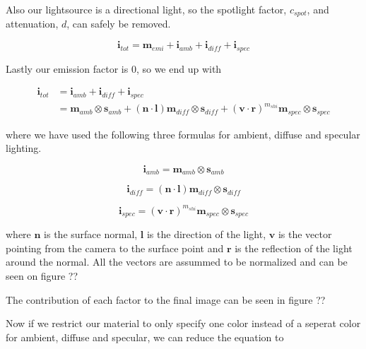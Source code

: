 Also our lightsource is a directional light, so the spotlight factor,
$c_{spot}$, and attenuation, $d$, can safely be removed.

\begin{displaymath}
  \mathbf{i}_{tot} = \mathbf{m}_{emi} + \mathbf{i}_{amb} + \mathbf{i}_{diff} + \mathbf{i}_{spec}
\end{displaymath}

Lastly our emission factor is 0, so we end up with

\begin{displaymath}
  \begin{array}{rl}
    \mathbf{i}_{tot} &= \mathbf{i}_{amb} + \mathbf{i}_{diff} +
    \mathbf{i}_{spec}\\
    &= \mathbf{m}_{amb} \otimes \mathbf{s}_{amb} + (\mathbf{n} \cdot
    \mathbf{l}) \mathbf{m}_{diff} \otimes \mathbf{s}_{diff} +
    (\mathbf{v} \cdot \mathbf{r})^{m_{shi}} \mathbf{m}_{spec} \otimes
    \mathbf{s}_{spec} 
  \end{array}
\end{displaymath}

where we have used the following three formulas for ambient, diffuse
and specular lighting.

\begin{displaymath}
  \mathbf{i}_{amb} = \mathbf{m}_{amb} \otimes \mathbf{s}_{amb} 
\end{displaymath}

\begin{displaymath}
  \mathbf{i}_{diff} = (\mathbf{n} \cdot \mathbf{l}) \mathbf{m}_{diff} \otimes \mathbf{s}_{diff} 
\end{displaymath}

\begin{displaymath}
  \mathbf{i}_{spec} = (\mathbf{v} \cdot \mathbf{r})^{m_{shi}} \mathbf{m}_{spec} \otimes \mathbf{s}_{spec} 
\end{displaymath}

where $\mathbf{n}$ is the surface normal, $\mathbf{l}$ is the
direction of the light, $\mathbf{v}$ is the vector pointing from the
camera to the surface point and $\mathbf{r}$ is the reflection of the
light around the normal. All the vectors are assummed to be normalized
and can be seen on figure ??


The contribution of each factor to the final image can be seen in figure ??

Now if we restrict our material to only specify one color instead of a
seperat color for ambient, diffuse and specular, we can reduce the
equation to 


